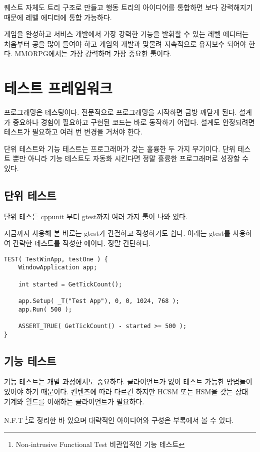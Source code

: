 \documentclass[chapter,kosection, 10.5pt, romanfixed, a4paper]{oblivoir}
\begin{document}
퀘스트 자체도 트리 구조로 만들고 행동 트리의 아이디어를 통합하면 보다 강력해지기 때문에 레벨 에디터에
통합 가능하다.

게임을 완성하고 서비스 개발에서 가장 강력한 기능을 발휘할 수 있는 레벨 에디터는 처음부터 공을 많이 
들여야 하고 게임의 개발과 맞물려 지속적으로 유지보수 되어야 한다. MMORPG에서는 가장 강력하며 가장 
중요한 툴이다. 


\section{테스트 프레임워크}

프로그래밍은 테스팅이다. 전문적으로 프로그래밍을 시작하면 금방 깨닫게 된다. 
설계가 중요하나 경험이 필요하고 구현된 코드는 바로 동작하기 어렵다. 설계도 
안정되려면 테스트가 필요하고 여러 번 변경을 거처야 한다. 

단위 테스트와 기능 테스트는 프로그래머가 갖는 훌륭한 두 가지 무기이다. 단위 테스트 뿐만 
아니라 기능 테스트도 자동화 시킨다면 정말 훌륭한 프로그래머로 성장할 수 있다. 

\subsection{단위 테스트}

단위 테스틑 cppunit 부터 gtest까지 여러 가지 툴이 나와 있다. 

지금까지 사용해 본 바로는 gtest가 간결하고 작성하기도 쉽다. 아래는 gtest를 
사용하여 간략한 테스트를 작성한 예이다. 정말 간단하다.

\begin{verbatim}
TEST( TestWinApp, testOne ) {
	WindowApplication app;

	int started = GetTickCount();

	app.Setup( _T("Test App"), 0, 0, 1024, 768 );
	app.Run( 500 );

	ASSERT_TRUE( GetTickCount() - started >= 500 );
}
\end{verbatim}

\subsection{기능 테스트}

기능 테스트는 개발 과정에서도 중요하다. 클라이언트가 없이 테스트 가능한 방법들이 있어야 하기 때문이다. 
컨텐츠에 따라 다르긴 하지만 HCSM 또는 HSM을 갖는 상태 기계와 월드를 이해하는 클라이언트가 필요하다. 

N.F.T \footnote{Non-intrusive Functional Test 비관입적인 기능 테스트}로 정리한 바 있으며 대략적인 아이디어와 
구성은 부록에서 볼 수 있다. 
\end{document}
